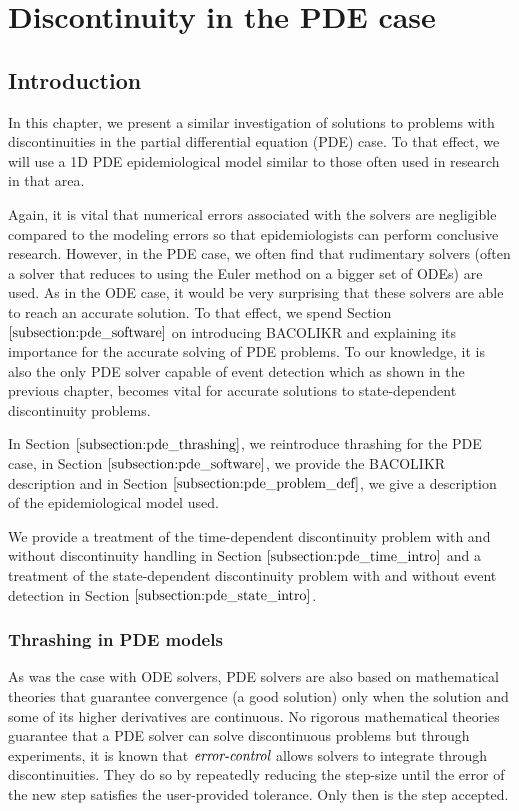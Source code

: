 \documentclass{article}
\begin{document}
\section{Discontinuity in the PDE case}
\subsection{Introduction}
\label{subsection:pde_intro}
In this chapter, we present a similar investigation of solutions to problems with discontinuities in the partial differential equation (PDE) case. To that effect, we will use a 1D PDE epidemiological model similar to those often used in research in that area. 

Again, it is vital that numerical errors associated with the solvers are negligible compared to the modeling errors so that epidemiologists can perform conclusive research. However, in the PDE case, we often find that rudimentary solvers (often a solver that reduces to using the Euler method on a bigger set of ODEs) are used. As in the ODE case, it would be very surprising that these solvers are able to reach an accurate solution. To that effect, we spend Section $\ref{subsection:pde_software}$ on introducing BACOLIKR and explaining its importance for the accurate solving of PDE problems. To our knowledge, it is also the only PDE solver capable of event detection which as shown in the previous chapter, becomes vital for accurate solutions to state-dependent discontinuity problems.

In Section $\ref{subsection:pde_thrashing}$, we reintroduce thrashing for the PDE case, in Section $\ref{subsection:pde_software}$, we provide the BACOLIKR description and in Section $\ref{subsection:pde_problem_def}$, we give a description of the epidemiological model used.

We provide a treatment of the time-dependent discontinuity problem with and without discontinuity handling in Section $\ref{subsection:pde_time_intro}$ and a treatment of the state-dependent discontinuity problem with and without event detection in Section $\ref{subsection:pde_state_intro}$.

\subsubsection{Thrashing in PDE models}
\label{subsection:pde_thrashing}
As was the case with ODE solvers, PDE solvers are also based on mathematical theories that guarantee convergence (a good solution) only when the solution and some of its higher derivatives are continuous. No rigorous mathematical theories guarantee that a PDE solver can solve discontinuous problems but through experiments, it is known that $\emph{error-control}$ allows solvers to integrate through discontinuities. They do so by repeatedly reducing the step-size until the error of the new step satisfies the user-provided tolerance. Only then is the step accepted.
\end{document}
